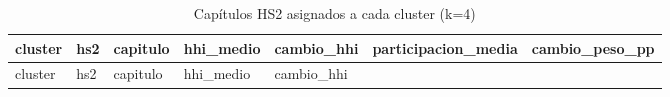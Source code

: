 \documentclass[
]{article}
\begin{document}
\begin{longtable}[]{@{}
  >{\raggedright\arraybackslash}p{}
  >{\raggedright\arraybackslash}p{}
  >{\raggedright\arraybackslash}p{}
  >{\raggedleft\arraybackslash}p{}
  >{\raggedleft\arraybackslash}p{}
  >{\raggedleft\arraybackslash}p{}
  >{\raggedleft\arraybackslash}p{}@{}}
\caption{Capítulos HS2 asignados a cada cluster (k=4)}\tabularnewline
\toprule\noalign{}
\begin{minipage}[b]{\linewidth}\raggedright
cluster
\end{minipage} & \begin{minipage}[b]{\linewidth}\raggedright
hs2
\end{minipage} & \begin{minipage}[b]{\linewidth}\raggedright
capitulo
\end{minipage} & \begin{minipage}[b]{\linewidth}\raggedleft
hhi\_medio
\end{minipage} & \begin{minipage}[b]{\linewidth}\raggedleft
cambio\_hhi
\end{minipage} & \begin{minipage}[b]{\linewidth}\raggedleft
participacion\_media
\end{minipage} & \begin{minipage}[b]{\linewidth}\raggedleft
cambio\_peso\_pp
\end{minipage} \\
\midrule\noalign{}
\endfirsthead
\toprule\noalign{}
\begin{minipage}[b]{\linewidth}\raggedright
cluster
\end{minipage} & \begin{minipage}[b]{\linewidth}\raggedright
hs2
\end{minipage} & \begin{minipage}[b]{\linewidth}\raggedright
capitulo
\end{minipage} & \begin{minipage}[b]{\linewidth}\raggedleft
hhi\_medio
\end{minipage} & \begin{minipage}[b]{\linewidth}\raggedleft
cambio\_hhi
\end{minipage} & \begin{minipage}[b]{\linewidth}\raggedleft

\end{minipage}
\end{longtable}
\end{document}
